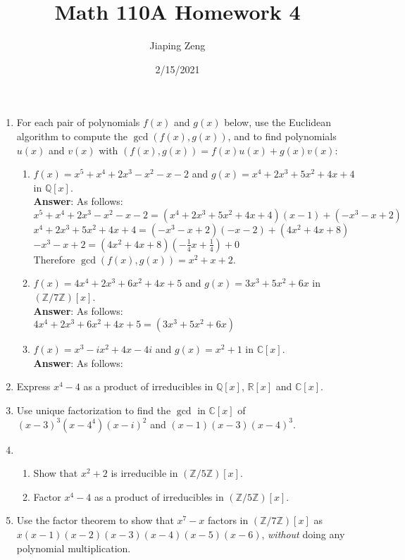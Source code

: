 \documentclass{article}
\title{Math 110A Homework 4}
\date{2/15/2021}
\author{Jiaping Zeng}
\begin{document}
\maketitle

\begin{enumerate}
      \item For each pair of polynomials $f(x)$ and $g(x)$ below, use the Euclidean algorithm to compute the $\gcd(f(x),g(x))$, and to find polynomials $u(x)$ and $v(x)$ with $(f(x),g(x))=f(x)u(x)+g(x)v(x)$:
            \begin{enumerate}[start=2]
                  \item $f(x)=x^5+x^4+2x^3-x^2-x-2$ and $g(x)=x^4+2x^3+5x^2+4x+4$ in $\mathbb{Q}[x]$.\\
                  \textbf{Answer}: As follows:\\
                  $x^5+x^4+2x^3-x^2-x-2=(x^4+2x^3+5x^2+4x+4)(x-1)+(-x^3-x+2)$\\
                  $x^4+2x^3+5x^2+4x+4=(-x^3-x+2)(-x-2)+(4x^2+4x+8)$\\
                  $-x^3-x+2=(4x^2+4x+8)(-\frac{1}{4}x+\frac{1}{4})+0$\\
                  Therefore $\gcd(f(x),g(x))=x^2+x+2$.
                  \item $f(x)=4x^4+2x^3+6x^2+4x+5$ and $g(x)=3x^3+5x^2+6x$ in $(\mathbb{Z}/7\mathbb{Z})[x]$.\\
                  \textbf{Answer}: As follows:\\
                  $4x^4+2x^3+6x^2+4x+5=(3x^3+5x^2+6x)$
                  \item $f(x)=x^3-ix^2+4x-4i$ and $g(x)=x^2+1$ in $\mathbb{C}[x]$.\\
                  \textbf{Answer}: As follows:\\
            \end{enumerate}
      \item Express $x^4-4$ as a product of irreducibles in $\mathbb{Q}[x]$, $\mathbb{R}[x]$ and $\mathbb{C}[x]$.
      \item Use unique factorization to find the $\gcd$ in $\mathbb{C}[x]$ of $(x-3)^3(x-4^4)(x-i)^2$ and $(x-1)(x-3)(x-4)^3$.
      \item
            \begin{enumerate}
                  \item Show that $x^2+2$ is irreducible in $(\mathbb{Z}/5\mathbb{Z})[x]$.
                  \item Factor $x^4-4$ as a product of irreducibles in $(\mathbb{Z}/5\mathbb{Z})[x]$.
            \end{enumerate}
      \item Use the factor theorem to show that $x^7-x$ factors in $(\mathbb{Z}/7\mathbb{Z})[x]$ as $x(x-1)(x-2)(x-3)(x-4)(x-5)(x-6)$, \textit{without} doing any polynomial multiplication.
\end{enumerate}
\end{document}
